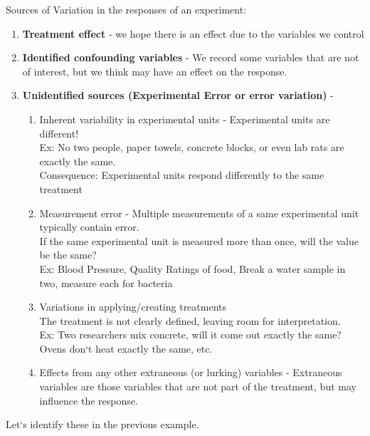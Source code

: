 Sources of Variation in the responses of an experiment:
\begin{enumerate}
\item \textbf{Treatment effect} - we hope there is an effect due to the variables we control
\item \textbf{Identified confounding variables} - We record some variables that are not of interest, but we think may have an effect on the response.
\item \textbf{Unidentified sources (Experimental Error or error variation)} -
		\begin{enumerate}
			\item Inherent variability in experimental units - Experimental units are different! \\
		Ex: No two people, paper towels, concrete blocks, or even lab rats are exactly the same.\\
		Consequence: Experimental units respond differently to the same treatment
			\item Measurement error - Multiple measurements of a same experimental unit typically contain error.\\
			If the same experimental unit is measured more than once, will the value be the same?\\
			Ex: Blood Pressure, Quality Ratings of food, Break a water sample in two, measure each for bacteria
			\item Variations in applying/creating treatments\\
		The treatment is not clearly defined, leaving room for interpretation.  \\
			Ex:  Two researchers mix concrete, will it come out exactly the same? Ovens don`t heat exactly the same, etc.
			\item Effects from any other extraneous (or lurking) variables - Extraneous variables are those variables that are not part of the treatment, but may influence the response.\\
		\end{enumerate}
\end{enumerate}
Let`s identify these in the previous example.\\

